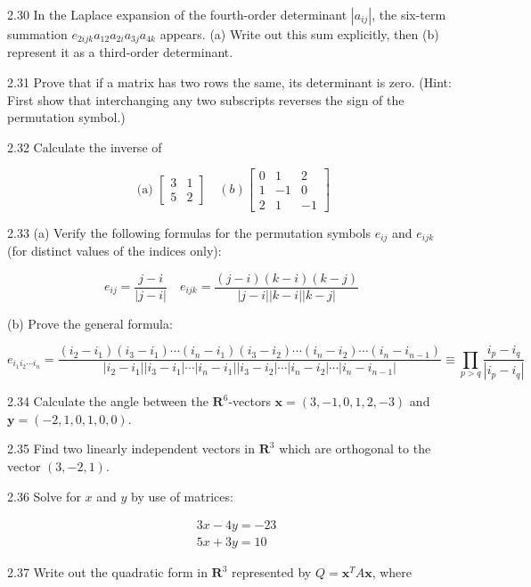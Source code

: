 \documentclass[10pt]{article}
\begin{document}
2.30 In the Laplace expansion of the fourth-order determinant $\left|a_{i j}\right|$, the six-term summation $e_{2 i j k} a_{12} a_{2 i} a_{3 j} a_{4 k}$ appears. (a) Write out this sum explicitly, then (b) represent it as a third-order determinant.

2.31 Prove that if a matrix has two rows the same, its determinant is zero. (Hint: First show that interchanging any two subscripts reverses the sign of the permutation symbol.)

2.32 Calculate the inverse of

$$
\text { (a) }\left[\begin{array}{ll}
3 & 1 \\
5 & 2
\end{array}\right] \quad(b)\left[\begin{array}{rrr}
0 & 1 & 2 \\
1 & -1 & 0 \\
2 & 1 & -1
\end{array}\right]
$$

2.33 (a) Verify the following formulas for the permutation symbols $e_{i j}$ and $e_{i j k}$ (for distinct values of the indices only):

$$
e_{i j}=\frac{j-i}{|j-i|} \quad e_{i j k}=\frac{(j-i)(k-i)(k-j)}{|j-i||k-i||k-j|}
$$

(b) Prove the general formula:

$$
e_{i_{1} i_{2} \cdots i_{n}}=\frac{\left(i_{2}-i_{1}\right)\left(i_{3}-i_{1}\right) \cdots\left(i_{n}-i_{1}\right)\left(i_{3}-i_{2}\right) \cdots\left(i_{n}-i_{2}\right) \cdots\left(i_{n}-i_{n-1}\right)}{\left|i_{2}-i_{1}\right|\left|i_{3}-i_{1}\right| \cdots\left|i_{n}-i_{1}\right|\left|i_{3}-i_{2}\right| \cdots\left|i_{n}-i_{2}\right| \cdots\left|i_{n}-i_{n-1}\right|} \equiv \prod_{p>q} \frac{i_{p}-i_{q}}{\left|i_{p}-i_{q}\right|}
$$

2.34 Calculate the angle between the $\mathbf{R}^{6}$-vectors $\mathbf{x}=(3,-1,0,1,2,-3)$ and $\mathbf{y}=(-2,1,0,1,0,0)$.

2.35 Find two linearly independent vectors in $\mathbf{R}^{3}$ which are orthogonal to the vector $(3,-2,1)$.

2.36 Solve for $x$ and $y$ by use of matrices:

$$
\begin{aligned}
& 3 x-4 y=-23 \\
& 5 x+3 y=10
\end{aligned}
$$

2.37 Write out the quadratic form in $\mathbf{R}^{3}$ represented by $Q=\mathbf{x}^{T} A \mathbf{x}$, where
\end{document}
